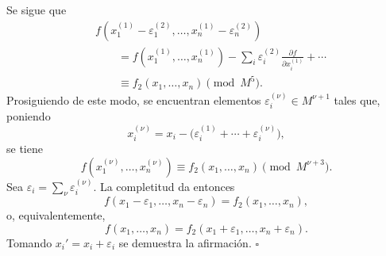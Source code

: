 
Se sigue que
\[
\begin{aligned}
&f(x_1^{(1)}-\varepsilon_1^{(2)},\ldots,
  x_n^{(1)}-\varepsilon_n^{(2)})\\
&\qquad =f(x_1^{(1)},\ldots,x_n^{(1)})
 -\sum_i\varepsilon_i^{(2)}
       \frac{\partial f}{\partial x_i^{(1)}}+\cdots\\
&\qquad \equiv f_2(x_1,\ldots,x_n)\pmod{M^5}.
\end{aligned}
\]
Prosiguiendo de este modo, se encuentran elementos
$\varepsilon_i^{(\nu)}\in M^{\nu+1}$ tales que, poniendo
\[
x_i^{(\nu)}
=x_i-\bigl(\varepsilon_i^{(1)}+\cdots+
            \varepsilon_i^{(\nu)}\bigr),
\]
se tiene
\[
f(x_1^{(\nu)},\ldots,x_n^{(\nu)})
\equiv f_2(x_1,\ldots,x_n)\pmod{M^{\nu+3}}.
\]
Sea $\varepsilon_i=\sum_\nu\varepsilon_i^{(\nu)}$. La completitud da
entonces
\[
f(x_1-\varepsilon_1,\ldots,x_n-\varepsilon_n)
=f_2(x_1,\ldots,x_n),
\]
o, equivalentemente,
\[
f(x_1,\ldots,x_n)
=f_2(x_1+\varepsilon_1,\ldots,x_n+\varepsilon_n).
\]
Tomando $x_i'=x_i+\varepsilon_i$ se demuestra la afirmación.
\hfill$\square$
